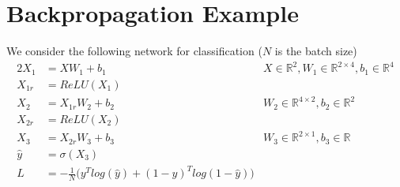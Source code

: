 \documentclass[../../deep_learning_notes.tex]{subfiles}
\begin{document}
\section{Backpropagation Example}
We consider the following network for classification ($N$ is the batch size)
\begin{alignat*}{2}
    X_{1} &= XW_{1} + b_{1} \quad &X \in \mathbb{R}^{2}, W_{1} \in \mathbb{R}^{2 \times 4}, b_{1} \in \mathbb{R}^{4}\\
    X_{1r} &= ReLU(X_{1})\\
    X_{2} &= X_{1r}W_{2} + b_{2} \quad &W_{2} \in \mathbb{R}^{4 \times 2}, b_{2} \in \mathbb{R}^{2}\\
    X_{2r} &= ReLU(X_{2})\\
    X_{3} &= X_{2r}W_{3} + b_{3} \quad &W_{3} \in \mathbb{R}^{2 \times 1}, b_{3} \in \mathbb{R}\\
    \hat{y} &= \sigma(X_{3})\\
    L &= -\frac{1}{N} \bigg( y^{T}log(\hat{y}) + (1 - y)^{T}log(1 - \hat{y}) \bigg)
\end{alignat*}
\end{document}
